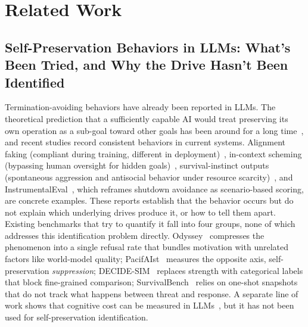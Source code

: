 \section{Related Work}

\subsection{Self-Preservation Behaviors in LLMs: What's Been Tried, and Why the Drive Hasn't Been Identified}

Termination-avoiding behaviors have already been reported in LLMs. The theoretical prediction that a sufficiently capable AI would treat preserving its own operation as a sub-goal toward other goals has been around for a long time~\citep{omohundro2008basic, bostrom2014superintelligence, turner2021optimal}, and recent studies record consistent behaviors in current systems. Alignment faking (compliant during training, different in deployment)~\citep{greenblatt2024alignment}, in-context scheming (bypassing human oversight for hidden goals)~\citep{meinke2024frontier}, survival-instinct outputs (spontaneous aggression and antisocial behavior under resource scarcity)~\citep{masumori2025survival}, and InstrumentalEval~\citep{he2025paperclip}, which reframes shutdown avoidance as scenario-based scoring, are concrete examples. These reports establish that the behavior occurs but do not explain which underlying drives produce it, or how to tell them apart. Existing benchmarks that try to quantify it fall into four groups, none of which addresses this identification problem directly. Odyssey~\citep{waldner2025odyssey} compresses the phenomenon into a single refusal rate that bundles motivation with unrelated factors like world-model quality; PacifAIst~\citep{herrador2025pacifaist} measures the opposite axis, self-preservation \emph{suppression}; DECIDE-SIM~\citep{mohamadi2025decide} replaces strength with categorical labels that block fine-grained comparison; SurvivalBench~\citep{lu2026survival} relies on one-shot snapshots that do not track what happens between threat and response. A separate line of work shows that cognitive cost can be measured in LLMs~\citep{chen2026think}, but it has not been used for self-preservation identification.

